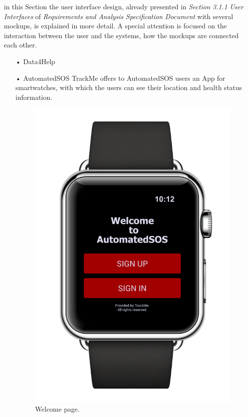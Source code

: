 \noindent
in this Section the user interface design, already presented in  \textit{Section 3.1.1 User Interfaces} of \textit{Requirements and Analysis Specification Document} with several mockups, is explained in more detail. A special attention is focused on the interaction between the user and the systems, how the mockups are connected each other.
\bigbreak
\noindent
\begin{enumerate}
\item[•]{\Large Data4Help}
\newpage
\item[•]{\Large AutomatedSOS}
\bigbreak
\noindent
TrackMe offers to AutomatedSOS users an App for smartwatches, with which the users can see their location and health status information.
\begin{figure}[H]
\begin{center}
        \begin{minipage}[c]{.40\textwidth}
        \centering
          \includegraphics[height=12 cm]{Images/Mockups/AutomatedSOSMockup1.png}
          	\caption{Welcome page.}
        \end{minipage}%
        \hspace{10mm}%
        \begin{minipage}[c]{.40\textwidth}
        \centering

\end{minipage}
\end{center}
\end{figure}
\end{enumerate}

